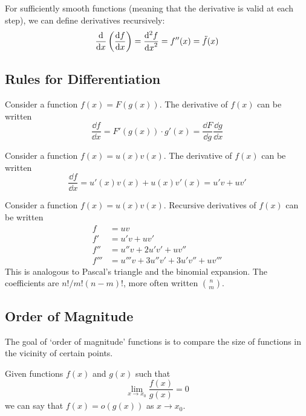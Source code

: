 \documentclass{article}
\begin{document}
For sufficiently smooth functions (meaning that the derivative is valid at each step), we can define derivatives recursively:
\[
	\frac{\mathrm{d}}{\dd{x}}\left( \frac{\dd{f}}{\dd{x}} \right)
	= \frac{\mathrm{d}^2f}{\dd{x}^2}
	= f''(x) = \ddot f (x)
\]

\subsection{Rules for Differentiation}
\begin{definition}
	Consider a function $f(x) = F(g(x))$. The derivative of $f(x)$ can be written
	\begin{equation}
		\frac{\dd{f}}{\dd{x}} = F'(g(x)) \cdot g'(x) = \frac{\dd{F}}{\dd{g}} \frac{\dd{g}}{\dd{x}}
	\end{equation}
\end{definition}

\begin{definition}
	Consider a function $f(x) = u(x)v(x)$. The derivative of $f(x)$ can be written
	\begin{equation}
		\frac{\dd{f}}{\dd{x}} = u'(x)v(x) + u(x)v'(x) = u'v + uv'
	\end{equation}
\end{definition}

\begin{definition}
	Consider a function $f(x) = u(x)v(x)$. Recursive derivatives of $f(x)$ can be written
	\begin{align}
		f    & = uv                                        \\
		f'   & = u'v + uv' \nonumber                       \\
		f''  & = u''v + 2u'v' + uv'' \nonumber             \\
		f''' & = u'''v + 3u''v' + 3u'v'' + uv''' \nonumber
	\end{align}
	This is analogous to Pascal's triangle and the binomial expansion. The coefficients are $n!/m!(n-m)!$, more often written $n \choose m$.
\end{definition}

\subsection{Order of Magnitude}
The goal of `order of magnitude' functions is to compare the size of functions in the vicinity of certain points.
\begin{definition}[Little $o$]
	Given functions $f(x)$ and $g(x)$ such that
	\begin{equation}
		\lim\limits_{x \to x_0} \frac{f(x)}{g(x)} = 0
	\end{equation}
	we can say that $f(x) = o(g(x))$ as $x \to x_0$.
\end{definition}
\end{document}

